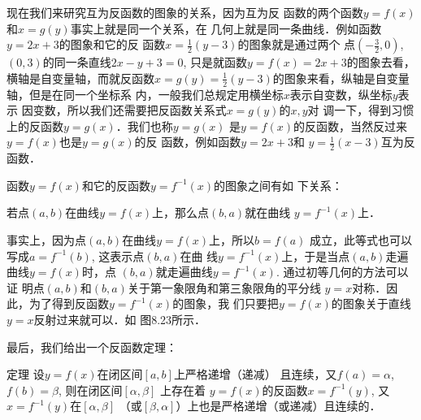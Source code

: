 现在我们来研究互为反函数的图象的关系，因为互为反
函数的两个函数$y=f(x)$和$x=g(y)$事实上就是同一个关系，在
几何上就是同一条曲线．例如函数$y=2x+3$的图象和它的反
函数$x=\frac{1}{2}(y-3)$的图象就是通过两个
点$\left(-\frac{3}{2},0\right)$, $(0,3)$的同一条直线$2x-y+3=0$, 只是就函数$y=f(x)=2x+
3$的图象去看，横轴是自变量轴，而就反函数$x=g(y)=\frac{1}{2}
(y-3)$的图象来看，纵轴是自变量轴，但是在同一个坐标系
内，一般我们总规定用横坐标$x$表示自变数，纵坐标$y$表示
因变数，所以我们还需要把反函数关系式$x=g(y)$的$x,y$对
调一下，得到习惯上的反函数$y=g(x)$．我们也称$y=g(x)$
是$y=f(x)$的反函数，当然反过来$y=f(x)$也是$y=g(x)$的反
函数，例如函数$y=2x+3$和 $y=\frac{1}{2}(x-3)$互为反函数．

函数$y=f(x)$和它的反函数$y=f^{-1}(x)$的图象之间有如
下关系：

若点$(a,b)$在曲线$y=f(x)$上，那么点$(b,a)$就在曲线
$y=f^{-1}(x)$上．

事实上，因为点$(a,b)$在曲线$y=f(x)$上，所以$b=f(a)$
成立，此等式也可以写成$a=f^{-1}(b)$, 这表示点$(b,a)$在曲
线$y=f^{-1}(x)$上，于是当点$(a,b)$走遍曲线$y=f(x)$时，点
$(b,a)$就走遍曲线$y=f^{-1}(x)$. 通过初等几何的方法可以证
明点$(a,b)$和$(b,a)$关于第一象限角和第三象限角的平分线
$y=x$对称．因此，为了得到反函数$y=f^{-1}(x)$的图象，我
们只要把$y=f(x)$的图象关于直线$y=x$反射过来就可以．如
图8.23所示．
\begin{figure}[htp]
    \centering
{}
    \caption{}
\end{figure}


最后，我们给出一个反函数定理：

\begin{blk}{定理}
    设$y=f(x)$在闭区间$[a,b]$上严格递增（递减）
且连续，又$f(a)=\alpha$, $f(b)=\beta$, 则在闭区间$[\alpha,\beta]$  上存在着
$y=f(x)$的反函数$x=f^{-1}(y)$, 又$x=f^{-1}(y)$在$[\alpha,\beta]$  （或$[\beta,\alpha]$）上也是严格递增（或递减）且连续的．
\end{blk}

